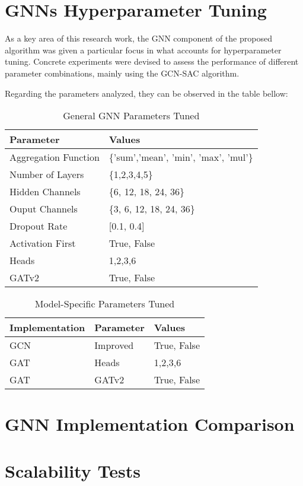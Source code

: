 \section{\acp{GNN} Hyperparameter Tuning} \label{sec:gnn-hypertune}

As a key area of this research work, the \ac{GNN} component of the proposed algorithm was given a particular focus in what accounts for hyperparameter tuning. Concrete experiments were devised to assess the performance of different parameter combinations, mainly using the GCN-SAC algorithm. 

Regarding the parameters analyzed, they can be observed in the table bellow:


\begin{table}
	\begin{tabular}{|l|l|}
		\hline
		\textbf{Parameter} & \textbf{Values} \\
		\hline
		Aggregation Function & \{'sum','mean', 'min', 'max', 'mul'\} \\
		\hline
		Number of Layers & \{1,2,3,4,5\} \\
		\hline
		Hidden Channels & \{6, 12, 18, 24, 36\} \\
		\hline
		Ouput Channels & \{3, 6, 12, 18, 24, 36\} \\
		\hline 
		Dropout Rate & [0.1, 0.4] \\
		\hline
		Activation First & {True, False} \\
		\hline 
		Heads & {1,2,3,6} \\
		\hline
		GATv2 & {True, False} \\
		\hline
	\end{tabular}
	\caption{General \ac{GNN} Parameters Tuned}
\end{table}

\begin{table}
	\begin{tabular}{|l|l|l|}
		\hline
		\textbf{Implementation} & \textbf{Parameter} & \textbf{Values} \\
		\hline
		GCN & Improved & {True, False} \\
		\hline 
		GAT & Heads & {1,2,3,6} \\
		\hline
		GAT & GATv2 & {True, False} \\
		\hline
	\end{tabular}
	\caption{Model-Specific Parameters Tuned}
\end{table}


\section{GNN Implementation Comparison} \label{sec:gnn-comparison}

\section{Scalability Tests} \label{sec:scalability-tests}

